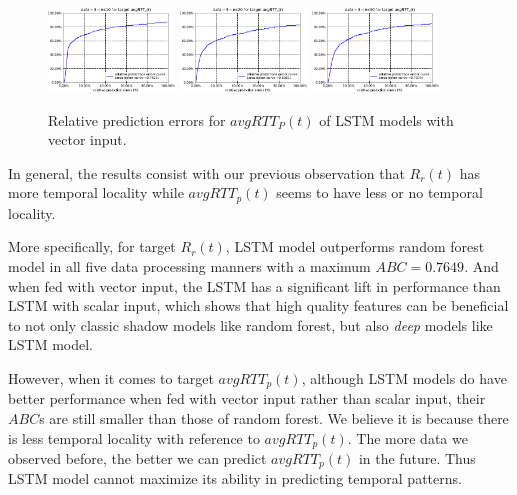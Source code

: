 \documentclass[sigconf]{acmart}
\begin{document}
	\begin{figure} 	
	\includegraphics[width=0.3\textwidth]{fig4/data-3-ws10-task-3-7030-lstm.pdf}
	\includegraphics[width=0.3\textwidth]{fig4/data-3-ws20-task-3-7030-lstm.pdf}
	\includegraphics[width=0.3\textwidth]{fig4/data-3-ws50-task-3-7030-lstm.pdf}
	\caption{Relative prediction errors for  $avgRTT_P(t)$ of LSTM models with vector input.}
	\label{fig:lstm-task3-vector}
	\end{figure}

	
	In general, the results consist with our previous observation that $R_r(t)$ has more temporal locality while $avgRTT_p(t)$ seems to have less or no temporal locality.
	
	More specifically, for target $R_r(t)$, LSTM model outperforms random forest model in all five data processing manners with a maximum $ABC=0.7649$. And when fed with vector input, the LSTM has a significant lift in performance than LSTM with scalar input, which shows that high quality features can be beneficial to not only classic shadow models like random forest, but also \textit{deep} models like LSTM model.
	
	However, when it comes to target $avgRTT_p(t)$, although LSTM models do have better performance when fed with vector input rather than scalar input, their $ABC$s are still smaller than those of random forest. We believe it is because there is less temporal locality with reference to $avgRTT_p(t)$. The more data we observed before, the better we can predict $avgRTT_p(t)$ in the future. Thus LSTM model cannot maximize its ability in predicting temporal patterns.
\end{document}

